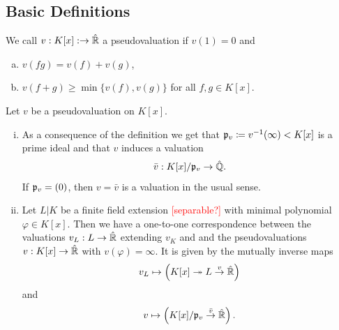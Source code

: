 \subsection{Basic Definitions}

\begin{definition} \label{def:pseudo-valuation}
    We call $v: K[x]: \to \hat{\mathbb R}$ a pseudovaluation if $v(1) = 0$ and
    \begin{enumerate}[(a)]
        \item $v(fg) = v(f) + v(g)$,
        \item $v(f + g) \geq \min\lbrace v(f), v(g) \rbrace$ for all $f,g\in K[x]$.
    \end{enumerate}
\end{definition}

\begin{remark}
    Let $v$ be a pseudovaluation on $K[x]$.
    \begin{enumerate} [(i)]
        \item As a consequence of the definition we get that $\mathfrak p_v \coloneqq v^{-1}(\infty) < K[x]$ is a prime ideal
            and that $v$ induces a valuation 
            \begin{align}
                \bar{v}: K[x]/\mathfrak p_v \to \hat{\mathbb Q}.
            \end{align}
            If $\mathfrak p_v = (0)$, then $v=\bar{v}$ is a valuation in the usual sense.
        \item Let $L|K$ be a finite field extension \textcolor{red}{[separable?]} with minimal polynomial $\varphi \in K[x]$.
            Then we have a one-to-one correspondence between the valuations $v_L: L \to \hat{\mathbb R}$ extending $v_K$ and 
            and the pseudovaluations $v: K[x] \to \hat{\mathbb R}$ with $v(\varphi)=\infty$.
            It is given by the mutually inverse maps
            \begin{align}
                v_L \mapsto \left( K[x] \twoheadrightarrow L \overset{v}{\to} \hat{\mathbb R} \right)
            \end{align}
            and
            \begin{align}
                v \mapsto \left(K[x]/\mathfrak p_v \overset{\bar{v}}{\to} \hat{\mathbb R}\right).
            \end{align}
    \end{enumerate}
\end{remark}


